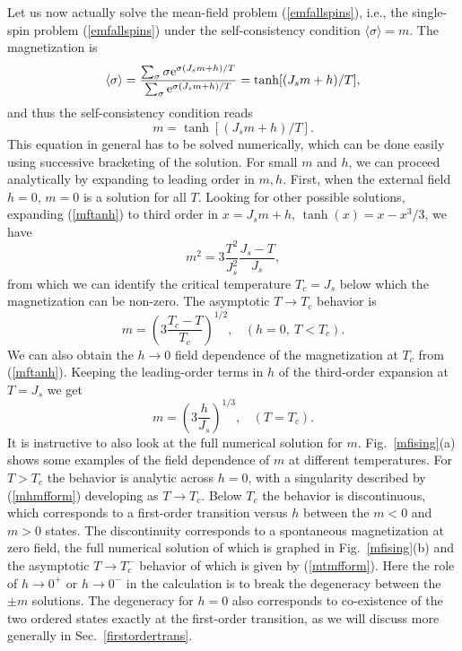\documentclass[draft,numberedheadings]{aipproc}
\begin{document}
Let us now actually solve the mean-field problem (\ref{emfallspins}), i.e., the single-spin problem (\ref{emfallspins}) under the self-consistency 
condition $\langle \sigma\rangle=m$. The magnetization is
\begin{equation}
\langle \sigma\rangle = \frac{\sum_{\sigma} \sigma {\rm e}^{\sigma(J_sm +h)/T}}{\sum_{\sigma}{\rm e}^{\sigma(J_sm +h)/T}} = \tanh[(J_sm + h)/T],
\end{equation}
and thus the self-consistency condition reads
\begin{equation}
m=\tanh[(J_s m + h)/T].
\label{mftanh}
\end{equation}
This equation in general has to be solved numerically, which can be done easily using successive bracketing of the solution. For small $m$ and $h$, we can 
proceed analytically by expanding to leading order in $m,h$. First, when the external field $h=0$, $m=0$ is a solution for all $T$. Looking for other possible 
solutions, expanding (\ref{mftanh}) to third order in $x=J_sm+h$, $\tanh(x)=x-x^3/3$, we have
\begin{equation}
m^2=3\frac{T^2}{J_s^2} \frac{J_s - T}{J_s}, 
\end{equation}
from which we can identify the critical temperature $T_c=J_s$ below which the magnetization can be non-zero. The asymptotic $T \to T_c$ behavior is 
\begin{equation}
m = \left (3\frac{T_c-T}{T_c}\right )^{1/2},~~~~(h=0,~T<T_c). 
\label{mtmfform}
\end{equation}
We can also obtain the $h \to 0$ field dependence of the magnetization at $T_c$ from (\ref{mftanh}). Keeping the leading-order terms in $h$ of
the third-order expansion at $T=J_s$ we get
\begin{equation}
m = \left (3\frac{h}{J_s}\right )^{1/3},~~~~(T=T_c). 
\label{mhmfform}
\end{equation}
It is instructive to also look at the full numerical solution for $m$. Fig.~\ref{mfising}(a) shows some examples of the field dependence of $m$ at different
temperatures. For $T>T_c$ the behavior is analytic across $h=0$, with a singularity described by (\ref{mhmfform}) developing as $T\to T_c$. Below $T_c$ the 
behavior is discontinuous, which corresponds to a first-order transition versus $h$ between the $m<0$ and $m>0$ states. The discontinuity corresponds to a
spontaneous magnetization at zero field, the full numerical solution of which is graphed in Fig.~\ref{mfising}(b) and the asymptotic $T \to T_c^-$ behavior of 
which is given by (\ref{mtmfform}). Here the role of $h \to 0^+$ or $h \to 0^-$ in the calculation is to break the degeneracy between the $\pm m$ solutions. 
The degeneracy for $h=0$ also corresponds to co-existence of the two ordered states exactly at the first-order transition, as we will discuss more
generally in Sec.~\ref{firstordertrans}.
\end{document}
